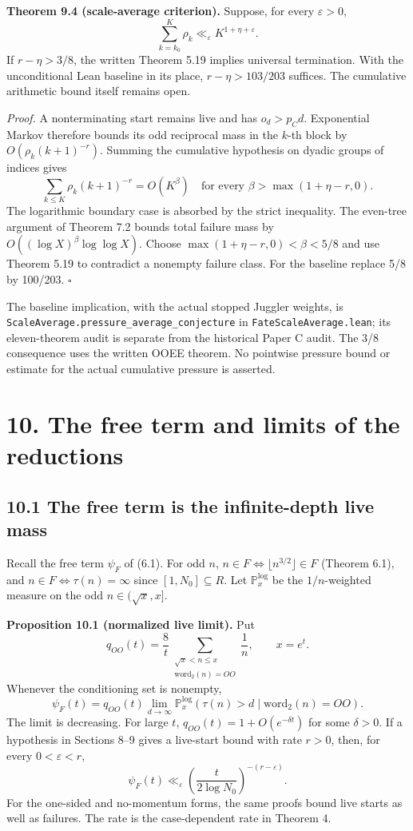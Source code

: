 \documentclass[11pt,a4paper]{article}
\begin{document}
\textbf{Theorem 9.4 (scale-average criterion).} Suppose, for every
\(\varepsilon>0\), \[
\sum_{k=k_0}^{K}\rho_k\ll_\varepsilon K^{1+\eta+\varepsilon}.
\] If \(r-\eta>3/8\), the written Theorem 5.19 implies universal
termination. With the unconditional Lean baseline in its place,
\(r-\eta>103/203\) suffices. The cumulative arithmetic bound itself
remains open.

\emph{Proof.} A nonterminating start remains live and has \(o_d>p_Cd\).
Exponential Markov therefore bounds its odd reciprocal mass in the
\(k\)-th block by \(O(\rho_k(k+1)^{-r})\). Summing the cumulative
hypothesis on dyadic groups of indices gives \[
\sum_{k\le K}\rho_k(k+1)^{-r}=O(K^\beta)
\quad\text{for every }\beta>\max(1+\eta-r,0).
\] The logarithmic boundary case is absorbed by the strict inequality.
The even-tree argument of Theorem 7.2 bounds total failure mass by
\(O((\log X)^\beta\log\log X)\). Choose \(\max(1+\eta-r,0)<\beta<5/8\)
and use Theorem 5.19 to contradict a nonempty failure class. For the
baseline replace 5/8 by 100/203. \(\square\)

The baseline implication, with the actual stopped Juggler weights, is
\texttt{\nolinkurl{ScaleAverage.pressure_average_conjecture}} in
\texttt{\nolinkurl{FateScaleAverage.lean}}; its eleven-theorem audit is
separate from the historical Paper C audit. The 3/8 consequence uses the
written OOEE theorem. No pointwise pressure bound or estimate for the
actual cumulative pressure is asserted.

\section{10. The free term and limits of the
reductions}\label{the-free-term-and-limits-of-the-reductions}

\subsection{10.1 The free term is the infinite-depth live
mass}\label{the-free-term-is-the-infinite-depth-live-mass}

Recall the free term \(\psi_F\) of (6.1). For odd \(n\),
\(n\in F\iff\lfloor n^{3/2}\rfloor\in F\) (Theorem 6.1), and
\(n\in F\iff\tau(n)=\infty\) since \([1,N_0]\subseteq R\). Let
\(\mathbb P^{\log}_x\) be the \(1/n\)-weighted measure on the odd
\(n\in(\sqrt x,x]\).

\textbf{Proposition 10.1 (normalized live limit).} Put \[
q_{OO}(t)=\frac8t
 \sum_{\substack{\sqrt x<n\le x\\ \mathrm{word}_2(n)=OO}}\frac1n,
\qquad x=e^t.
\] Whenever the conditioning set is nonempty, \[
\psi_F(t)=q_{OO}(t)\lim_{d\to\infty}
 \mathbb P_x^{\log}(\tau(n)>d\mid\mathrm{word}_2(n)=OO).
\tag{10.1}
\] The limit is decreasing. For large \(t\),
\(q_{OO}(t)=1+O(e^{-\delta t})\) for some \(\delta>0\). If a hypothesis
in Sections 8--9 gives a live-start bound with rate \(r>0\), then, for
every \(0<\varepsilon<r\), \[
\psi_F(t)\ll_\varepsilon
 \left(\frac{t}{2\log N_0}\right)^{-(r-\varepsilon)}.
\tag{10.2}
\] For the one-sided and no-momentum forms, the same proofs bound live
starts as well as failures. The rate is the case-dependent rate in
Theorem 4.
\end{document}
